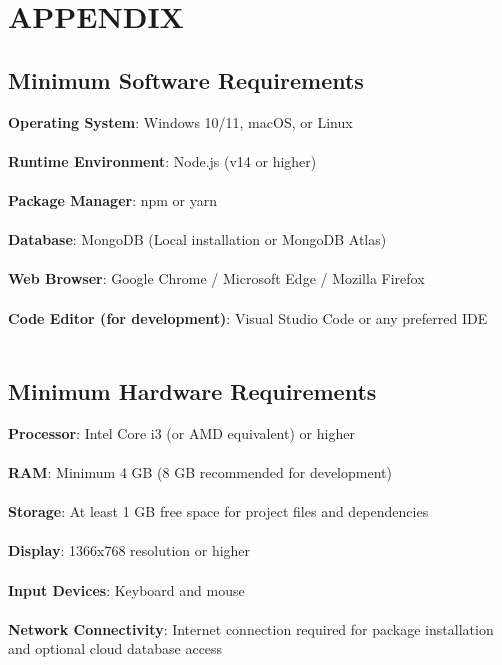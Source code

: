 \chapter{APPENDIX}

\section{Minimum Software Requirements}

\medskip
\textbf{Operating System}: Windows 10/11, macOS, or Linux
\\\\
\textbf{Runtime Environment}: Node.js (v14 or higher)
\\\\
\textbf{Package Manager}: npm or yarn
\\\\
\textbf{Database}: MongoDB (Local installation or MongoDB Atlas)
\\\\
\textbf{Web Browser}: Google Chrome / Microsoft Edge / Mozilla Firefox
\\\\
\textbf{Code Editor (for development)}: Visual Studio Code or any preferred IDE
\\\\

\section{Minimum Hardware Requirements}

\textbf{Processor}: Intel Core i3 (or AMD equivalent) or higher
\\\\
\textbf{RAM}: Minimum 4 GB (8 GB recommended for development)
\\\\
\textbf{Storage}: At least 1 GB free space for project files and dependencies
\\\\
\textbf{Display}: 1366x768 resolution or higher
\\\\
\textbf{Input Devices}: Keyboard and mouse
\\\\
\textbf{Network Connectivity}: Internet connection required for package installation and optional cloud database access
\\\\